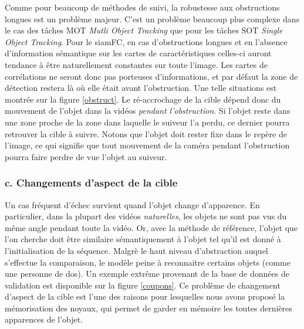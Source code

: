 \documentclass[10pt,twocolumn,letterpaper,french]{article}
\begin{document}
Comme pour beaucoup de méthodes de suivi, la robustesse aux obstructions longues est un problème majeur. C'est un problème beaucoup plus complexe dans le cas des tâches MOT \textit{Mutli Object Tracking} que pour les tâches SOT \textit{Single Object Tracking}. Pour le siamFC, en cas d'obstructions longues et en l'absence d'information sémantique sur les cartes de caractéristiques celles-ci auront tendance à être naturellement constantes sur toute l'image. Les cartes de corrélations ne seront donc pas porteuses d'informations, et par défaut la zone de détection restera là où elle était avant l'obstruction. Une telle situations est montrée sur la figure \ref{obstruct}. Le ré-accrochage de la cible dépend donc du mouvement de l'objet dans la vidéos \textit{pendant l'obstruction}. Si l'objet reste dans une zone proche de la zone dans laquelle le suiveur l'a perdu, ce dernier pourra retrouver la cible à suivre. Notons que l'objet doit rester fixe dans le repère de l'image, ce qui signifie que tout mouvement de la caméra pendant l'obstruction pourra faire perdre de vue l'objet au suiveur. 






\subsubsection*{c. Changements d'aspect de la cible}
\label{aspect}

Un cas fréquent d'échec survient quand l'objet change d'apparence. En particulier, dans la plupart des vidéos \textit{naturelles}, les objets ne sont pas vus du même angle pendant toute la vidéo. Or, avec la méthode de référence, l'objet que l'on cherche doit être similaire sémantiquement à l'objet tel qu'il est donné à l'initialisation de la séquence. Malgrè le haut niveau d'abstraction auquel s'effectue la comparaison, le modèle peine à reconnaitre certains objets (comme une personne de dos). Un exemple extrême provenant de la base de données de validation est disponible sur la figure \ref{coupons}. 
Ce problème de changement d'aspect de la cible est l'une des raisons pour lesquelles nous avons proposé la mémorisation des noyaux, qui permet de garder en mémoire les toutes dernières apparences de l'objet.
\end{document}
